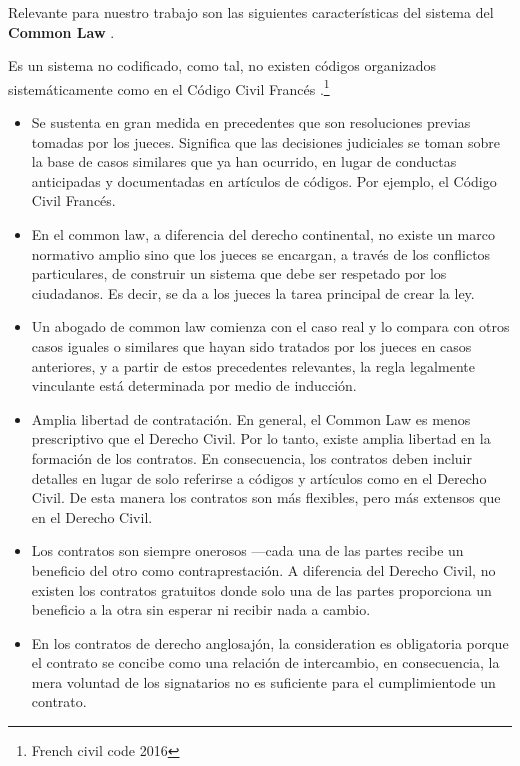 \documentclass[12pt]{report} %
\begin{document}
\begin{itemize}
Relevante para nuestro trabajo son las siguientes características del sistema del \textbf{Common Law} .

Es un sistema no codificado, como tal, no existen códigos organizados sistemáticamente como en el Código Civil Francés .\footnote{\cite{JohnCart2016}French civil code 2016}



\begin{itemize}
    \item Se sustenta en gran medida en precedentes que son resoluciones previas tomadas por los jueces. Significa que las decisiones judiciales se toman sobre la base de casos similares que ya han ocurrido, en lugar de conductas anticipadas y documentadas en artículos de códigos. Por ejemplo, el Código Civil Francés.

\item En el common law, a diferencia del derecho continental, no existe un marco normativo amplio sino que los jueces se encargan, a través de los conflictos particulares, de construir un sistema que debe ser respetado por los ciudadanos. Es decir, se da a los jueces la tarea principal de crear la ley.

\item Un abogado de common law comienza con el caso real y lo compara con otros casos iguales o similares que hayan sido tratados por los jueces en casos anteriores, y a partir de estos precedentes relevantes, la regla legalmente vinculante está determinada por medio de inducción.

\item Amplia libertad de contratación. En general, el Common Law es menos prescriptivo que el Derecho Civil. Por lo tanto, existe amplia libertad en la formación de los contratos. En consecuencia, los contratos deben incluir detalles en lugar de solo referirse a códigos y artículos como en el Derecho Civil. De esta manera los contratos son más flexibles, pero más extensos que en el Derecho Civil.

\item Los contratos son siempre onerosos —cada una de las partes recibe un beneficio del otro como contraprestación. A diferencia del Derecho Civil, no existen los contratos gratuitos donde solo una de las partes proporciona un beneficio a la otra sin esperar ni recibir nada a cambio.

\item En los contratos de derecho anglosajón, la consideration es obligatoria porque el contrato se concibe como una relación de intercambio, en consecuencia, la mera voluntad de los signatarios no es suficiente para el cumplimientode un contrato.    
    

\end{itemize}
\end{itemize}
\end{document}
